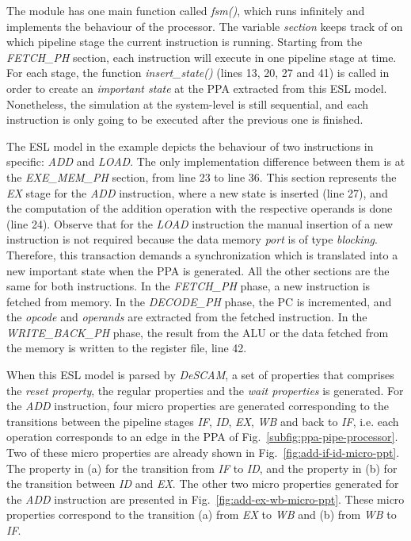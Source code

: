 The module has one main function called \textit{fsm()}, which runs infinitely and implements the behaviour of the processor. The variable \textit{section} keeps track of on which pipeline stage the current instruction is running. Starting from the \textit{FETCH\_PH} section, each instruction will execute in one pipeline stage at time. For each stage, the function \textit{insert\_state()} (lines 13, 20, 27 and 41) is called in order to create an \textit{important state} at the PPA extracted from this ESL model. Nonetheless, the simulation at the system-level is still sequential, and each instruction is only going to be executed after the previous one is finished.

The ESL model in the example depicts the behaviour of two instructions in specific: \textit{ADD} and \textit{LOAD}. The only implementation difference between them is at the \textit{EXE\_MEM\_PH} section, from line 23 to line 36. This section represents the \textit{EX} stage for the \textit{ADD} instruction, where a new state is inserted (line 27), and the computation of the addition operation with the respective operands is done (line 24). Observe that for the \textit{LOAD} instruction the manual insertion of a new instruction is not required because the data memory \textit{port} is of type \textit{blocking}. Therefore, this transaction demands a synchronization which is translated into a new important state when the PPA is generated. All the other sections are the same for both instructions. In the \textit{FETCH\_PH} phase, a new instruction is fetched from memory. In the \textit{DECODE\_PH} phase, the PC is incremented, and the \textit{opcode} and \textit{operands} are extracted from the fetched instruction. In the \textit{WRITE\_BACK\_PH} phase, the result from the ALU or the data fetched from the memory is written to the register file, line 42.

When this ESL model is parsed by \textit{DeSCAM}, a set of properties that comprises the \textit{reset property}, the regular properties and the \textit{wait properties} is generated. For the \textit{ADD} instruction, four micro properties are generated corresponding to the transitions between the pipeline stages \textit{IF}, \textit{ID}, \textit{EX}, \textit{WB} and back to \textit{IF}, i.e. each operation corresponds to an edge in the PPA of Fig.~\ref{subfig:ppa-pipe-processor}. Two of these micro properties are already shown in Fig.~\ref{fig:add-if-id-micro-ppt}. The property in (a) for the transition from \textit{IF} to \textit{ID}, and the property in (b) for the transition between \textit{ID} and \textit{EX}. The other two micro properties generated for the \textit{ADD} instruction are presented in Fig.~\ref{fig:add-ex-wb-micro-ppt}. These micro properties correspond to the transition (a) from \textit{EX} to \textit{WB}  and (b) from \textit{WB} to \textit{IF}. 

